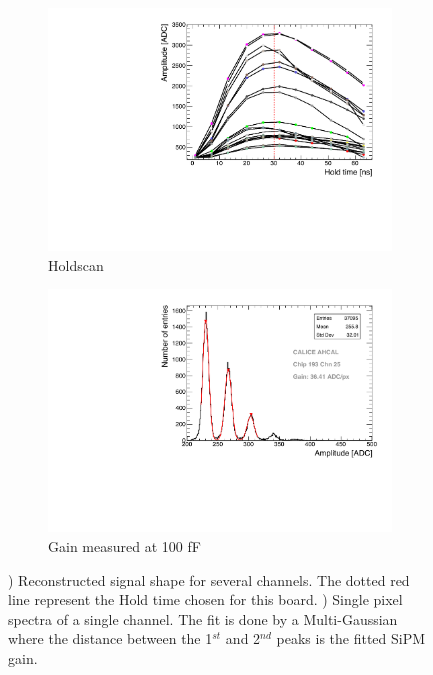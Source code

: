 \begin{figure}[htbp!]
  \centering
  \begin{subfigure}[t]{0.49\textwidth}
    \includegraphics[width=1.\linewidth]{chap4/fig_Commi/Holdscan_HBU2_15.pdf}
    \caption{Holdscan} \label{fig:Holdscan}
  \end{subfigure}
  \hfill
  \begin{subfigure}[t]{0.49\textwidth}
    \includegraphics[width=1.\linewidth]{chap4/fig_Commi/Gain100fF_MainzHBU4.pdf}
    \caption{Gain measured at 100 fF} \label{fig:Gain100fF}
  \end{subfigure}
  \caption{) Reconstructed signal shape for several channels. The dotted red line represent the Hold time chosen for this board. ) Single pixel spectra of a single channel. The fit is done by a Multi-Gaussian where the distance between the 1$^{st}$ and 2$^{nd}$ peaks is the fitted SiPM gain.}
\end{figure}

